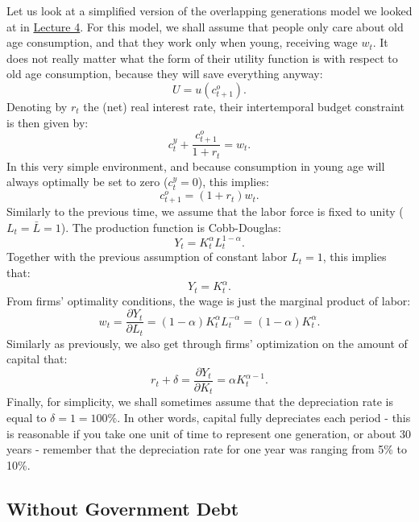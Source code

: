 \documentclass[]{book}
\theoremstyle{definition}
\theoremstyle{definition}
\theoremstyle{definition}
\theoremstyle{remark}
\begin{document}
Let us look at a simplified version of the overlapping generations model
we looked at in \protect\hyperlink{olg}{Lecture 4}. For this model, we
shall assume that people only care about old age consumption, and that
they work only when young, receiving wage \(w_{t}\). It does not really
matter what the form of their utility function is with respect to old
age consumption, because they will save everything anyway:
\[U=u(c_{t+1}^{o}).\] Denoting by \(r_t\) the (net) real interest rate,
their intertemporal budget constraint is then given by:
\[c_{t}^{y}+\frac{c_{t+1}^{o}}{1+r_t}=w_{t}.\] In this very simple
environment, and because consumption in young age will always optimally
be set to zero (\(c_{t}^{y}=0\)), this implies:
\[c_{t+1}^{o}=(1+r_t)w_{t}.\] Similarly to the previous time, we assume
that the labor force is fixed to unity (\(L_{t}=\bar{L}=1\)). The
production function is Cobb-Douglas:
\[Y_{t}=K_{t}^{\alpha}L_{t}^{1-\alpha}.\] Together with the previous
assumption of constant labor \(L_{t}=1\), this implies that:
\[Y_{t}=K_{t}^{\alpha}.\] From firms' optimality conditions, the wage is
just the marginal product of labor:
\[w_{t}=\frac{\partial Y_{t}}{\partial L_{t}}=(1-\alpha)K_{t}^{\alpha}L_{t}^{-\alpha}=(1-\alpha)K_{t}^{\alpha}.\]
Similarly as previously, we also get through firms' optimization on the
amount of capital that:
\[r_t+\delta=\frac{\partial Y_{t}}{\partial K_{t}}=\alpha K_{t}^{\alpha-1}.\]
Finally, for simplicity, we shall sometimes assume that the depreciation
rate is equal to \(\delta=1=100\%\). In other words, capital fully
depreciates each period - this is reasonable if you take one unit of
time to represent one generation, or about 30 years - remember that the
depreciation rate for one year was ranging from 5\% to 10\%.

\subsection{Without Government Debt}\label{without-government-debt}
\end{document}
